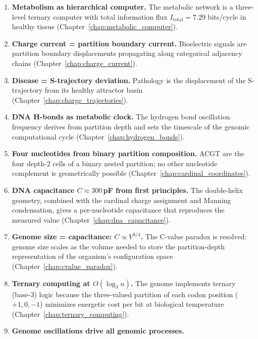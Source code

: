 \begin{enumerate}[label=\textbf{\arabic*.}]
        $\dC$ between substrate and product partition coordinates,
        with correlation $r = 0.97$ across 10 enzymes
        (Chapter~\ref{chap:enzymes_topology}).
  \item \textbf{Metabolism as hierarchical computer.}
        The metabolic network is a three-level ternary computer with total
        information flux $I_{\mathrm{total}} = 7.29$ bits/cycle in healthy tissue
        (Chapter~\ref{chap:metabolic_computer}).
  \item \textbf{Charge current = partition boundary current.}
        Bioelectric signals are partition boundary displacements propagating
        along categorical adjacency chains
        (Chapter~\ref{chap:charge_current}).
  \item \textbf{Disease = S-trajectory deviation.}
        Pathology is the displacement of the S-trajectory from its
        healthy attractor basin (Chapter~\ref{chap:charge_trajectories}).
  \item \textbf{DNA H-bonds as metabolic clock.}
        The hydrogen bond oscillation frequency derives from partition depth
        and sets the timescale of the genomic computational cycle
        (Chapter~\ref{chap:hydrogen_bonds}).
  \item \textbf{Four nucleotides from binary partition composition.}
        ACGT are the four depth-2 cells of a binary nested partition;
        no other nucleotide complement is geometrically possible
        (Chapter~\ref{chap:cardinal_coordinates}).
  \item \textbf{DNA capacitance $C \approx 300$\,pF from first principles.}
        The double-helix geometry, combined with the cardinal charge assignment
        and Manning condensation, gives a per-nucleotide capacitance that
        reproduces the measured value (Chapter~\ref{chap:dna_capacitance}).
  \item \textbf{Genome size = capacitance: $C \propto V^{3/4}$.}
        The C-value paradox is resolved: genome size scales as the volume
        needed to store the partition-depth representation of the organism's
        configuration space (Chapter~\ref{chap:cvalue_paradox}).
  \item \textbf{Ternary computing at $O(\log_3 n)$.}
        The genome implements ternary (base-3) logic because the three-valued
        partition of each codon position ($+1, 0, -1$) minimizes energetic
        cost per bit at biological temperature (Chapter~\ref{chap:ternary_computing}).
  \item \textbf{Genome oscillations drive all genomic processes.}

\end{enumerate}
